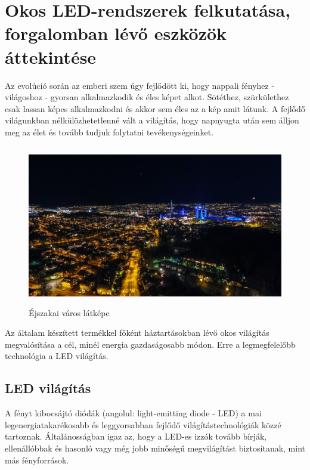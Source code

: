\documentclass[../main.tex]{subfiles}
\begin{document}
\section{Okos LED-rendszerek felkutatása, forgalomban lévő eszközök áttekintése}
    Az evolúció során az emberi szem úgy fejlődött ki, hogy nappali fényhez - világoshoz - gyorsan alkalmazkodik és éles képet alkot. Sötéthez, szürkülethez csak lassan képes alkalmazkodni és akkor sem éles az a kép amit látunk. A fejlődő világunkban nélkülözhetetlenné vált a világítás, hogy napnyugta után sem álljon meg az élet és tovább tudjuk folytatni tevékenységeinket.
    \begin{figure}[h!] %
        \centering
        \includegraphics[height=7cm]{irodalom_res/night_life.jpg}
        \caption{Éjszakai város látképe} %
    \end{figure}
    
    Az általam készített termékkel főként háztartásokban lévő okos világítás megvalósítása a cél, minél energia gazdaságosabb módon. Erre a legmegfelelőbb technológia a LED világítás.
    
    \subsection{LED világítás} %
    
    A fényt kibocsájtó diódák (angolul: light-emitting diode - LED) a mai legenergiatakarékosabb és leggyorsabban fejlődő világítástechnológiák közzé tartoznak. Általánosságban igaz az, hogy a LED-es izzók tovább bírják, ellenállóbbak és hasonló vagy még jobb minőségű megvilágítást biztosítanak, mint más fényforrások.
    
\end{document}
